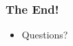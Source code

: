 \documentclass[14pt,mathserif]{beamer}
\begin{document}
\begin{frame}
  \frametitle{The End!}

\begin{itemize}
  \item Questions?
\end{itemize}

\end{frame}
\end{document}
